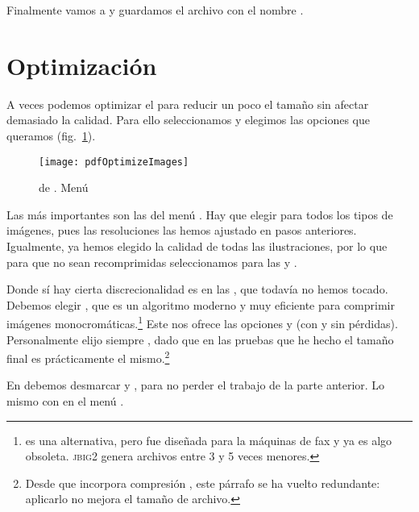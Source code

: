 \documentclass[%
	a5paper,
	10pt,
	twoside,
	openright,
	final,
]{memoir}
\begin{document}
	Finalmente vamos a  y guardamos el archivo con el nombre .

	\section{Optimización\label{sec:pdfOptimize}} A veces podemos optimizar el \pdf para reducir un poco el tamaño sin afectar demasiado la calidad. Para ello seleccionamos  y elegimos las opciones que queramos (fig.~\ref{fig:pdfOptimizeImages}).

	\begin{figure}
		\texttt{[image: pdfOptimizeImages]}
		\caption[PDF Optimizer de \acrobat.]{ de \acrobat. Menú \label{fig:pdfOptimizeImages}}
	\end{figure}

	Las más importantes son las del menú . Hay que elegir  para todos los tipos de imágenes, pues las resoluciones las hemos ajustado en pasos anteriores. Igualmente, ya hemos elegido la calidad de todas las ilustraciones, por lo que para que no sean recomprimidas seleccionamos  para las  y .

	Donde sí hay cierta discrecionalidad es en las , que todavía no hemos tocado. Debemos elegir , que es un algoritmo moderno y muy eficiente para comprimir imágenes monocromáticas.\footnote{ es una alternativa, pero fue diseñada para la máquinas de fax y ya es algo obsoleta. \textsc{jbig2} genera archivos entre 3 y 5 veces menores.} Este nos ofrece las opciones  y  (con y sin pérdidas). Personalmente elijo siempre , dado que en las pruebas que he hecho el tamaño final es prácticamente el mismo.\footnote{Desde que \abby incorpora compresión \jbig, este párrafo se ha vuelto redundante: aplicarlo no mejora el tamaño de archivo.}

	En  debemos desmarcar  y , para no perder el trabajo de la parte anterior. Lo mismo con  en el menú .
\end{document}
